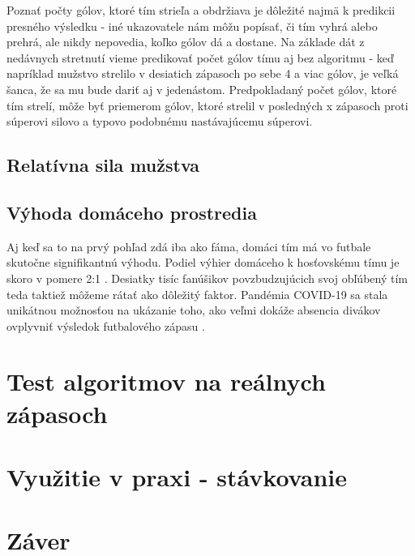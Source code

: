 \documentclass[10pt,twoside,slovak,a4paper]{article}
\begin{document}
Poznať počty gólov, ktoré tím strieľa a obdržiava je dôležité najmä k predikcii presného výsledku - iné ukazovatele nám môžu popísať, či tím vyhrá alebo prehrá, ale nikdy nepovedia, koľko gólov dá a dostane. Na základe dát z nedávnych stretnutí vieme predikovať počet gólov tímu aj bez algoritmu - keď napríklad mužstvo strelilo v desiatich zápasoch po sebe 4 a viac gólov, je veľká šanca, že sa mu bude dariť aj v jedenástom. Predpokladaný počet gólov, ktoré tím strelí, môže byť priemerom gólov, ktoré strelil v posledných x zápasoch proti súperovi silovo a typovo podobnému nastávajúcemu súperovi.

\subsection{Relatívna sila mužstva}

\subsection{Výhoda domáceho prostredia}

Aj keď sa to na prvý pohľad zdá iba ako fáma, domáci tím má vo futbale skutočne signifikantnú výhodu. Podiel výhier domáceho k hosťovskému tímu je skoro v pomere 2:1 \cite{dixon1997modelling}. Desiatky tisíc fanúšikov povzbudzujúcich svoj obľúbený tím teda taktiež môžeme rátať ako dôležitý faktor. Pandémia COVID-19 sa stala unikátnou možnosťou na ukázanie toho, ako veľmi dokáže absencia divákov ovplyvniť výsledok futbalového zápasu \cite{2020}.

\section{Test algoritmov na reálnych zápasoch}

\section{Využitie v praxi - stávkovanie}

\section{Záver} \label{zaver} %



\end{document}
